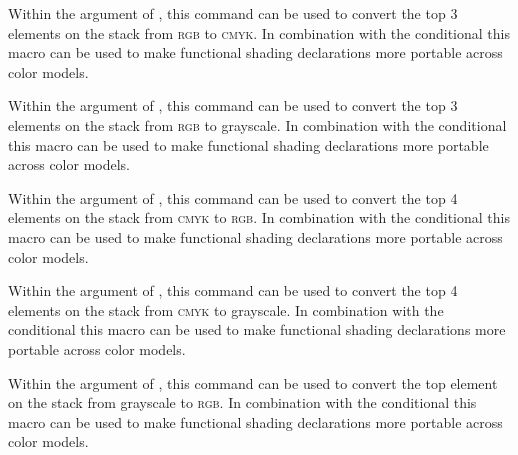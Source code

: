 \begin{command}{\pgffuncshadingrgbtocmyk}
  Within the  argument of
  , this command can be used to convert the
  top 3 elements on the stack from \textsc{rgb} to \textsc{cmyk}. In
  combination with the  conditional this macro can
  be used to make functional shading declarations more portable across color
  models.
\end{command}

\begin{command}{\pgffuncshadingrgbtogray}
  Within the  argument of
  , this command can be used to convert the
  top 3 elements on the stack from \textsc{rgb} to grayscale. In combination
  with the  conditional this macro can be used to
  make functional shading declarations more portable across color models.
\end{command}

\begin{command}{\pgffuncshadingcmyktorgb}
  Within the  argument of
  , this command can be used to convert the
  top 4 elements on the stack from \textsc{cmyk} to \textsc{rgb}. In
  combination with the  conditional this macro can be
  used to make functional shading declarations more portable across color
  models.
\end{command}

\begin{command}{\pgffuncshadingcmyktogray}
  Within the  argument of
  , this command can be used to convert the
  top 4 elements on the stack from \textsc{cmyk} to grayscale. In combination
  with the  conditional this macro can be used to
  make functional shading declarations more portable across color models.
\end{command}

\begin{command}{\pgffuncshadinggraytorgb}
  Within the  argument of
  , this command can be used to convert the
  top element on the stack from grayscale to \textsc{rgb}. In combination with
  the  conditional this macro can be used to make
  functional shading declarations more portable across color models.
\end{command}

